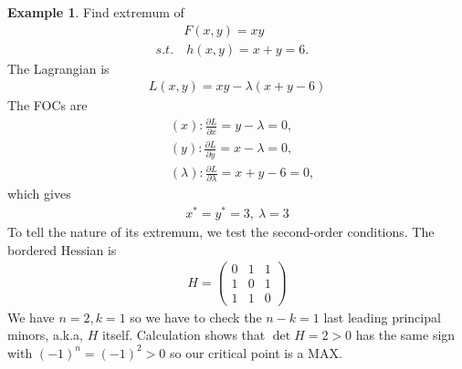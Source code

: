 \documentclass[10pt,a4paper]{book}
\theoremstyle{definition}\newtheorem{definition}{Definition}
\theoremstyle{definition}\newtheorem{fact}{Fact}
\theoremstyle{definition}\newtheorem{ex}{Ex.}
\theoremstyle{definition}\newtheorem{project}{Project}
\theoremstyle{definition}\newtheorem{problem}{Problem}
\theoremstyle{definition}\newtheorem{example}{Example}
\numberwithin{theorem}{chapter}
\numberwithin{corollary}{chapter}
\numberwithin{assumption}{chapter}
\numberwithin{definition}{chapter}
\numberwithin{prop}{chapter}
\numberwithin{notation}{chapter}
\numberwithin{problem}{chapter}
\numberwithin{example}{chapter}
\numberwithin{fact}{chapter}
\numberwithin{ex}{chapter}
\begin{document}
	
	\begin{example}
		Find extremum of
		\begin{align*}
			& F(x,y) = xy          \\
			s.t. &\ h(x,y) = x+ y = 6. &                      
		\end{align*}
		The Lagrangian is
		\begin{align*}
			L(x,y) = xy - \lambda (x+y-6) 
		\end{align*}
		The FOCs are
		\begin{align*}
			& (x): \frac{\partial L}{\partial x} = y - \lambda = 0,           \\
			& (y): \frac{\partial L}{\partial y} = x - \lambda = 0,           \\
			& (\lambda): \frac{\partial L}{\partial \lambda} = x + y - 6 = 0, 
		\end{align*}
		which gives
		\begin{align*}
			x^* = y^* = 3, \ \lambda = 3 
		\end{align*}
		To tell the nature of its extremum, we test the second-order conditions. The bordered Hessian is
		\begin{align*}
			H = \begin{pmatrix}
				0 & 1 & 1 \\
				1 & 0 & 1 \\
				1 & 1 & 0 
			\end{pmatrix}
		\end{align*}
		We have $n=2, k=1$ so we have to check the $n-k=1$ last leading principal minors, a.k.a, $H$ itself. Calculation shows that $\det H = 2 > 0$ has the same sign with $(-1)^n = (-1)^2 > 0$ so our critical point is a MAX. 
	\end{example}
	
\end{document}

